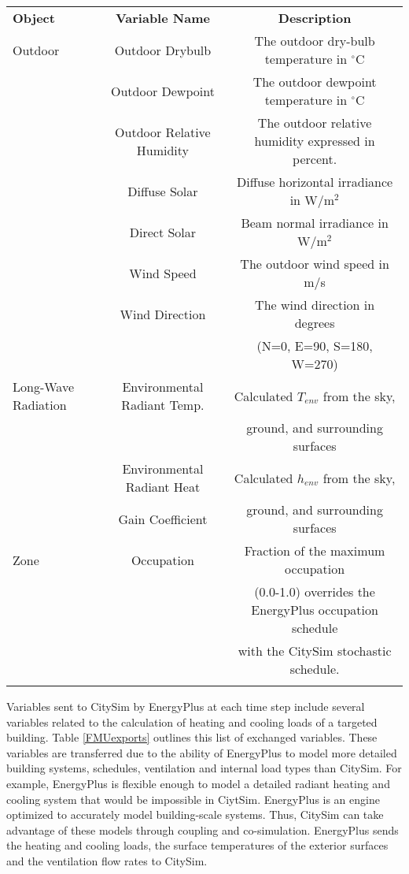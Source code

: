 \documentclass{tBPS2e}
\theoremstyle{plain}
\theoremstyle{definition}
\theoremstyle{remark}
\begin{document}
\begin{table}[H]
{\begin{tabular}[l]{@{}lcc}\toprule
  \bf{Object} &  \bf{Variable Name} & \bf{Description} \\
\colrule
  Outdoor & Outdoor Drybulb & The outdoor dry-bulb temperature in $^{\circ}\mathrm{C}$ \\
 & Outdoor Dewpoint & The outdoor dewpoint temperature in $^{\circ}\mathrm{C}$ \\
 & Outdoor Relative Humidity & The outdoor relative humidity expressed in percent. \\
 & Diffuse Solar & Diffuse horizontal irradiance in W/m$^2$ \\
 & Direct Solar & Beam normal irradiance in W/m$^2$ \\
 & Wind Speed & The outdoor wind speed in m/s \\
 & Wind Direction & The wind direction in degrees\\&&  (N=0, E=90, S=180, W=270) \\
 \hline
 Long-Wave Radiation & Environmental Radiant Temp. & Calculated $T_{env}$ from the sky,\\&& ground, and surrounding surfaces \\
 & Environmental Radiant Heat  & Calculated $h_{env}$ from the sky,\\
 & Gain Coefficient & ground, and surrounding surfaces \\
 
 \hline
Zone & Occupation & Fraction of the maximum occupation\\&& (0.0-1.0) overrides the EnergyPlus 
occupation schedule\\&&  with the CitySim stochastic schedule. \\
\botrule
\end{tabular}}
\label{FMUimports}
\end{table}

Variables sent to CitySim by EnergyPlus at each time step include several
variables related to the calculation of heating and cooling loads of a
targeted building. Table \ref{FMUexports} outlines this list of exchanged variables.
These variables are transferred due to the ability of
EnergyPlus to model more detailed building systems, schedules, ventilation and
internal load types than CitySim. For example, EnergyPlus is flexible enough
to model a detailed radiant heating and cooling system that would be
impossible in CiytSim. EnergyPlus is an engine
optimized to accurately model building-scale systems. Thus, CitySim can take 
advantage of these models through coupling and co-simulation. EnergyPlus sends
the heating and cooling loads, the surface temperatures of the exterior
surfaces and the ventilation flow rates to CitySim.
\end{document}
